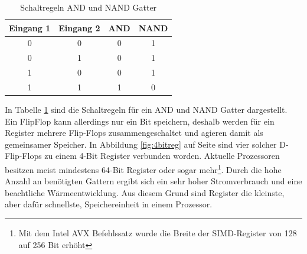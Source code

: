 \documentclass[12pt]{article}
\begin{document}
\begin{table}[!htb]
\centering
\label{andnand}
\begin{tabular}{|c|c|c|c|}
\hline
Eingang 1 & Eingang 2 & AND & NAND \\ \hline
0         & 0         & 0   & 1    \\ \hline
0         & 1         & 0   & 1    \\ \hline
1         & 0         & 0   & 1    \\ \hline
1         & 1         & 1   & 0    \\ \hline
\end{tabular}
\caption{Schaltregeln AND und NAND Gatter}
\end{table}

In Tabelle \ref{andnand} sind die Schaltregeln für ein AND und NAND Gatter dargestellt. Ein FlipFlop kann allerdings nur ein Bit speichern, deshalb werden für ein Register mehrere Flip-Flops zusammengeschaltet und agieren damit als gemeinsamer Speicher. In Abbildung \ref{fig:4bitreg} auf Seite \pageref{page:4bitreg} sind vier solcher D-Flip-Flops zu einem 4-Bit Register verbunden worden.  Aktuelle Prozessoren besitzen meist mindestens 64-Bit Register oder sogar mehr\footnote{Mit dem Intel AVX Befehlssatz wurde die Breite der SIMD-Register von 128 auf 256 Bit erhöht\cite{lomont2011introduction}}. Durch die hohe Anzahl an benötigten Gattern ergibt sich ein sehr hoher Stromverbrauch und eine beachtliche Wärmeentwicklung. Aus diesem Grund sind Register die kleinste, aber dafür schnellste, Speichereinheit in einem Prozessor.
\end{document}

